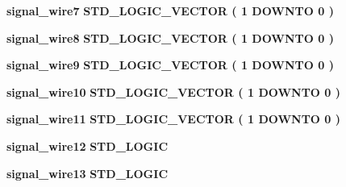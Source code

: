 \begin{DoxyCompactItemize}
\item 
{\bf signal\+\_\+wire7} {\bfseries \textcolor{comment}{S\+T\+D\+\_\+\+L\+O\+G\+I\+C\+\_\+\+V\+E\+C\+T\+OR}\textcolor{vhdlchar}{ }\textcolor{vhdlchar}{(}\textcolor{vhdlchar}{ }\textcolor{vhdlchar}{ } \textcolor{vhdldigit}{1} \textcolor{vhdlchar}{ }\textcolor{keywordflow}{D\+O\+W\+N\+TO}\textcolor{vhdlchar}{ }\textcolor{vhdlchar}{ } \textcolor{vhdldigit}{0} \textcolor{vhdlchar}{ }\textcolor{vhdlchar}{)}\textcolor{vhdlchar}{ }} 
\item 
{\bf signal\+\_\+wire8} {\bfseries \textcolor{comment}{S\+T\+D\+\_\+\+L\+O\+G\+I\+C\+\_\+\+V\+E\+C\+T\+OR}\textcolor{vhdlchar}{ }\textcolor{vhdlchar}{(}\textcolor{vhdlchar}{ }\textcolor{vhdlchar}{ } \textcolor{vhdldigit}{1} \textcolor{vhdlchar}{ }\textcolor{keywordflow}{D\+O\+W\+N\+TO}\textcolor{vhdlchar}{ }\textcolor{vhdlchar}{ } \textcolor{vhdldigit}{0} \textcolor{vhdlchar}{ }\textcolor{vhdlchar}{)}\textcolor{vhdlchar}{ }} 
\item 
{\bf signal\+\_\+wire9} {\bfseries \textcolor{comment}{S\+T\+D\+\_\+\+L\+O\+G\+I\+C\+\_\+\+V\+E\+C\+T\+OR}\textcolor{vhdlchar}{ }\textcolor{vhdlchar}{(}\textcolor{vhdlchar}{ }\textcolor{vhdlchar}{ } \textcolor{vhdldigit}{1} \textcolor{vhdlchar}{ }\textcolor{keywordflow}{D\+O\+W\+N\+TO}\textcolor{vhdlchar}{ }\textcolor{vhdlchar}{ } \textcolor{vhdldigit}{0} \textcolor{vhdlchar}{ }\textcolor{vhdlchar}{)}\textcolor{vhdlchar}{ }} 
\item 
{\bf signal\+\_\+wire10} {\bfseries \textcolor{comment}{S\+T\+D\+\_\+\+L\+O\+G\+I\+C\+\_\+\+V\+E\+C\+T\+OR}\textcolor{vhdlchar}{ }\textcolor{vhdlchar}{(}\textcolor{vhdlchar}{ }\textcolor{vhdlchar}{ } \textcolor{vhdldigit}{1} \textcolor{vhdlchar}{ }\textcolor{keywordflow}{D\+O\+W\+N\+TO}\textcolor{vhdlchar}{ }\textcolor{vhdlchar}{ } \textcolor{vhdldigit}{0} \textcolor{vhdlchar}{ }\textcolor{vhdlchar}{)}\textcolor{vhdlchar}{ }} 
\item 
{\bf signal\+\_\+wire11} {\bfseries \textcolor{comment}{S\+T\+D\+\_\+\+L\+O\+G\+I\+C\+\_\+\+V\+E\+C\+T\+OR}\textcolor{vhdlchar}{ }\textcolor{vhdlchar}{(}\textcolor{vhdlchar}{ }\textcolor{vhdlchar}{ } \textcolor{vhdldigit}{1} \textcolor{vhdlchar}{ }\textcolor{keywordflow}{D\+O\+W\+N\+TO}\textcolor{vhdlchar}{ }\textcolor{vhdlchar}{ } \textcolor{vhdldigit}{0} \textcolor{vhdlchar}{ }\textcolor{vhdlchar}{)}\textcolor{vhdlchar}{ }} 
\item 
{\bf signal\+\_\+wire12} {\bfseries \textcolor{comment}{S\+T\+D\+\_\+\+L\+O\+G\+IC}\textcolor{vhdlchar}{ }} 
\item 
{\bf signal\+\_\+wire13} {\bfseries \textcolor{comment}{S\+T\+D\+\_\+\+L\+O\+G\+IC}\textcolor{vhdlchar}{ }} 

\end{DoxyCompactItemize}
